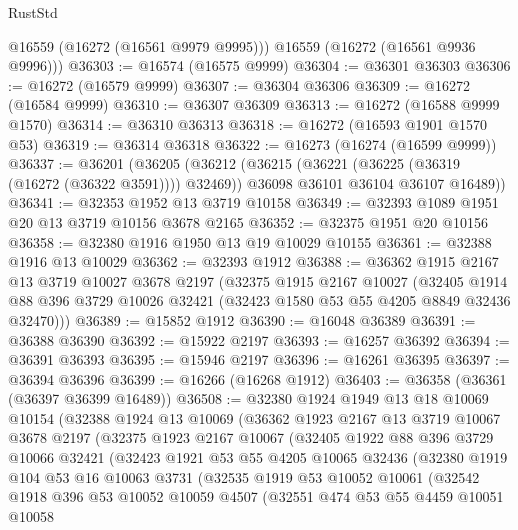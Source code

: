 \begin{lexlean}{RustStd}
\begin{coremodule}
        @16559
        (@16272 (@16561 @9979 @9995)))
      @16559
      (@16272 (@16561 @9936 @9996)))
@36303 := @16574 (@16575 @9999)
@36304 := @36301 @36303
@36306 := @16272 (@16579 @9999)
@36307 := @36304 @36306
@36309 := @16272 (@16584 @9999)
@36310 := @36307 @36309
@36313 := @16272 (@16588 @9999 @1570)
@36314 := @36310 @36313
@36318 := @16272 (@16593 @1901 @1570 @53)
@36319 := @36314 @36318
@36322 := @16273 (@16274 (@16599 @9999))
@36337 := @36201
    (@36205
      (@36212
        (@36215 (@36221 (@36225 (@36319 (@16272 (@36322 @3591)))) @32469))
        @36098
        @36101
        @36104
        @36107
        @16489))
@36341 := @32353 @1952 @13 @3719 @10158
@36349 := @32393 @1089 @1951 @20 @13 @3719 @10156 @3678 @2165
@36352 := @32375 @1951 @20 @10156
@36358 := @32380 @1916 @1950 @13 @19 @10029 @10155
@36361 := @32388 @1916 @13 @10029
@36362 := @32393 @1912
@36388 := @36362
    @1915
    @2167
    @13
    @3719
    @10027
    @3678
    @2197
    (@32375
      @1915
      @2167
      @10027
      (@32405 @1914 @88 @396 @3729 @10026 @32421 (@32423 @1580 @53 @55 @4205 @8849 @32436 @32470)))
@36389 := @15852 @1912
@36390 := @16048 @36389
@36391 := @36388 @36390
@36392 := @15922 @2197
@36393 := @16257 @36392
@36394 := @36391 @36393
@36395 := @15946 @2197
@36396 := @16261 @36395
@36397 := @36394 @36396
@36399 := @16266 (@16268 @1912)
@36403 := @36358 (@36361 (@36397 @36399 @16489))
@36508 := @32380
    @1924
    @1949
    @13
    @18
    @10069
    @10154
    (@32388
      @1924
      @13
      @10069
      (@36362
        @1923
        @2167
        @13
        @3719
        @10067
        @3678
        @2197
        (@32375
          @1923
          @2167
          @10067
          (@32405
            @1922
            @88
            @396
            @3729
            @10066
            @32421
            (@32423
              @1921
              @53
              @55
              @4205
              @10065
              @32436
              (@32380
                @1919
                @104
                @53
                @16
                @10063
                @3731
                (@32535
                  @1919
                  @53
                  @10052
                  @10061
                  (@32542
                    @1918
                    @396
                    @53
                    @10052
                    @10059
                    @4507
                    (@32551
                      @474
                      @53
                      @55
                      @4459
                      @10051
                      @10058

\end{coremodule}
\end{lexlean}
